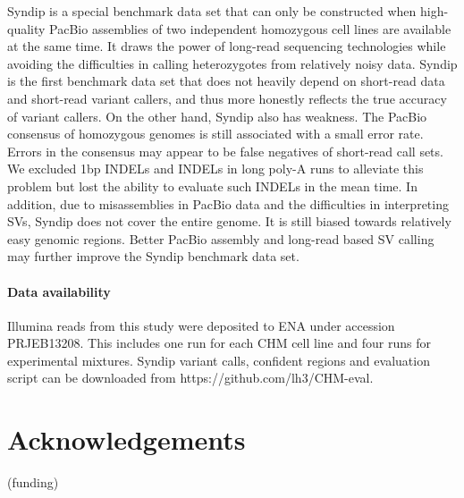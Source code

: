 \documentclass{bioinfo}
\begin{document}
Syndip is a special benchmark data set that can only be constructed when
high-quality PacBio assemblies of two independent homozygous cell lines are
available at the same time. It draws the power of long-read sequencing
technologies while avoiding the difficulties in calling heterozygotes from
relatively noisy data. Syndip is the first benchmark data set that does not
heavily depend on short-read data and short-read variant callers, and thus more
honestly reflects the true accuracy of variant callers. On the other hand,
Syndip also has weakness. The PacBio consensus of homozygous genomes
is still associated with a small error rate. Errors in the consensus may appear
to be false negatives of short-read call sets. We excluded 1bp INDELs and
INDELs in long poly-A runs to alleviate this problem but lost the ability to
evaluate such INDELs in the mean time. In addition, due to misassemblies in
PacBio data and the difficulties in interpreting SVs, Syndip does not cover
the entire genome. It is still biased towards relatively easy genomic
regions. Better PacBio assembly and long-read based SV calling may further
improve the Syndip benchmark data set.

\paragraph{Data availability\textcolon} Illumina reads from this study were
deposited to ENA under accession PRJEB13208. This includes one run for each CHM
cell line and four runs for experimental mixtures. Syndip
variant calls, confident regions and evaluation script can be downloaded from
https://github.com/lh3/CHM-eval.

\section*{Acknowledgements}

(funding)


\end{document}
